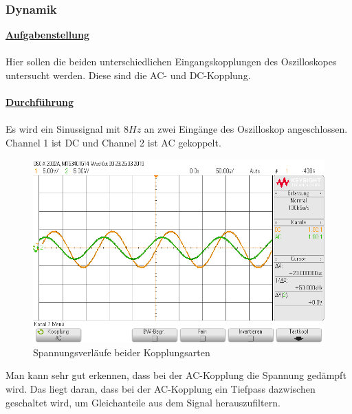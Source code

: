 \documentclass[a4paper,12pt]{article}
\begin{document}
	\subsubsection{Dynamik}
	\underline{\textbf{Aufgabenstellung}} \\ \\
	Hier sollen die beiden unterschiedlichen Eingangskopplungen des Oszilloskopes untersucht werden. Diese sind die AC- und DC-Kopplung. \\ \\
	\underline{\textbf{Durchführung}} \\ \\
	Es wird ein Sinussignal mit $8Hz$ an zwei Eingänge des Oszilloskop angeschlossen. Channel 1 ist DC und Channel 2 ist AC gekoppelt.
	\begin{figure}[h]
		\centering
		\includegraphics[width=12cm]{img/ACDC}
		\caption{Spannungsverläufe beider Kopplungsarten}
	\end{figure}
	\newline
	Man kann sehr gut erkennen, dass bei der AC-Kopplung die Spannung gedämpft wird. Das liegt daran, dass bei der AC-Kopplung ein Tiefpass dazwischen geschaltet wird, um Gleichanteile aus dem Signal herauszufiltern.
	\newpage
\end{document}
